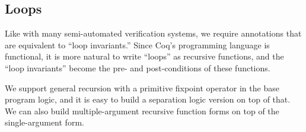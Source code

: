 \documentclass[preprint,nocopyrightspace]{sigplanconf}
\newcommand{\cd}[1]{\texttt{#1}}
\begin{document}






\subsection{Loops}

Like with many semi-automated verification systems, we require annotations that are equivalent to ``loop invariants.''  Since Coq's programming language is functional, it is more natural to write ``loops'' as recursive functions, and the ``loop invariants'' become the pre- and post-conditions of these functions.

We support general recursion with a primitive fixpoint operator in the base program logic, and it is easy to build a separation logic version on top of that.  We can also build multiple-argument recursive function forms on top of the single-argument form.
\end{document}

